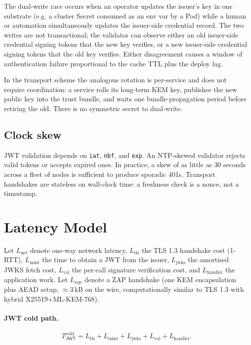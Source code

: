 \documentclass[11pt,a4paper]{article}
\theoremstyle{plain}
\theoremstyle{definition}
\newcommand{\JWT}{\mathsf{JWT}}
\begin{document}
The dual-write race occurs when an operator updates the issuer's key in one
substrate (e.g. a cluster Secret consumed as an env var by a Pod) while a
human or automation simultaneously updates the issuer-side credential
record. The two writes are not transactional; the validator can observe
either an old issuer-side credential signing tokens that the new key
verifies, or a new issuer-side credential signing tokens that the old key
verifies. Either disagreement causes a window of authentication failure
proportional to the cache TTL plus the deploy lag.

In the transport scheme the analogous rotation is per-service and does not
require coordination: a service rolls its long-term KEM key, publishes the
new public key into the trust bundle, and waits one bundle-propagation
period before retiring the old. There is no symmetric secret to dual-write.

\subsection{Clock skew}
\label{sec:clockskew}

JWT validation depends on \texttt{iat}, \texttt{nbf}, and \texttt{exp}. An
NTP-skewed validator rejects valid tokens or accepts expired ones. In
practice, a skew of as little as 30 seconds across a fleet of nodes is
sufficient to produce sporadic 401s. Transport handshakes are stateless
on wall-clock time: a freshness check is a nonce, not a timestamp.

\section{Latency Model}
\label{sec:latency}

Let $L_{\text{net}}$ denote one-way network latency, $L_{\text{tls}}$ the
TLS 1.3 handshake cost (1-RTT), $L_{\text{mint}}$ the time to obtain a JWT
from the issuer, $L_{\text{jwks}}$ the amortised JWKS fetch cost,
$L_{\text{val}}$ the per-call signature verification cost, and
$L_{\text{handler}}$ the application work. Let $L_{\text{zap}}$ denote a
ZAP handshake (one KEM encapsulation plus AEAD setup, $\approx 3$\,kB on
the wire, computationally similar to TLS 1.3 with hybrid X25519+ML-KEM-768).

\paragraph{JWT cold path.}
\[
T_{\JWT}^{\text{cold}} = L_{\text{tls}} + L_{\text{mint}} + L_{\text{jwks}} + L_{\text{val}} + L_{\text{handler}}.
\]
\end{document}
